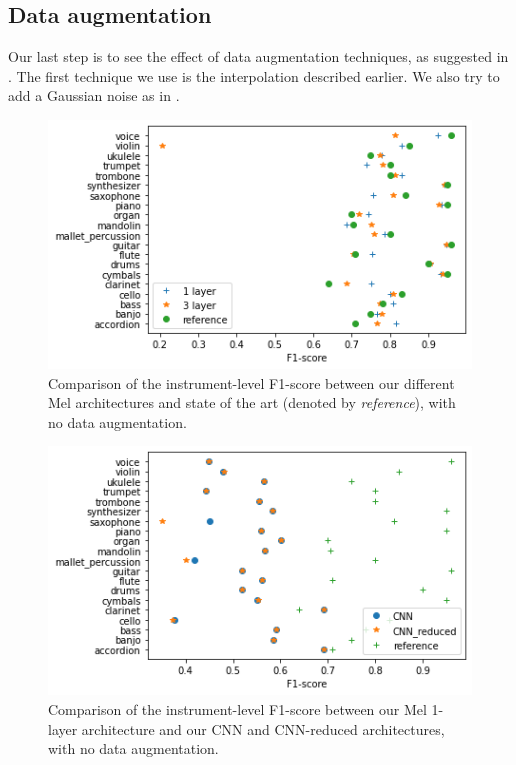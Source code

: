 \documentclass[final]{cvpr}
\begin{document}
\subsection{Data augmentation}
Our last step is to see the effect of data augmentation techniques, as suggested in \cite{squelette_progr}. The first technique we use is the interpolation described earlier. We also try to add a Gaussian noise as in \cite{data_aug}.
\begin{figure}
	\centering
	\includegraphics[scale = 0.5]{to_ref.png}
	\caption{Comparison of the instrument-level F1-score between our different Mel architectures and state of the art (denoted by \textit{reference}), with no data augmentation.}
	\label{to_ref}
\end{figure}
\begin{figure}
	\centering
	\includegraphics[scale = 0.5]{cnn_plot.png}
	\caption{Comparison of the instrument-level F1-score between our Mel 1-layer architecture and our CNN and CNN-reduced architectures, with no data augmentation.}
	\label{cnn_plot}
\end{figure}
\end{document}
